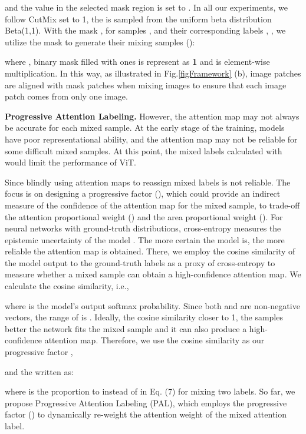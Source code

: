 \documentclass{article} \usepackage{iclr2023_conference,times}
\begin{document}
and the value in the selected mask region is set to . In all our experiments, we follow CutMix \citep{yun2019cutmix} set  to 1, the  is sampled from the uniform beta distribution Beta(1,1). With the mask , for samples ,  and their corresponding labels , , we utilize the mask  to generate their mixing samples ():



where , binary mask filled with ones is represent as \textbf{1} and  is element-wise multiplication. In this way, as illustrated in Fig.\ref{figFramework} (b), image patches are aligned with mask patches when mixing images to ensure that each image patch comes from only one image.

\textbf{Progressive Attention Labeling.} However, the attention map  may not always be accurate for each mixed sample. At the early stage of the training, models have poor representational ability, and the attention map  may not be reliable for some difficult mixed samples. At this point, the mixed labels calculated with  would limit the performance of ViT.

Since blindly using attention maps to reassign mixed labels is not reliable. The focus is on designing a  progressive factor (), which could provide an indirect measure of the confidence of the attention map for the mixed sample, to trade-off the attention proportional weight () and the area proportional weight (). For neural networks with ground-truth distributions, cross-entropy measures the epistemic uncertainty of the model \citep{2017What}. The more certain the model is, the more reliable the attention map is obtained. There, we employ the cosine similarity of the model output to the ground-truth labels as a proxy of cross-entropy to measure whether a mixed sample can obtain a high-confidence attention map. We calculate the cosine similarity, i.e., 


where  is the model’s output softmax probability. Since both  and  are non-negative vectors, the range of  is . Ideally, the cosine similarity  closer to 1, the samples better the network fits the mixed sample and it can also produce a high-confidence attention map. Therefore, we use the cosine similarity as our progressive factor , 



and the  written as:
\vspace{-10px}


where  is the proportion to instead of  in Eq. (7) for mixing two labels. So far, we propose Progressive Attention Labeling (PAL), which employs the progressive factor () to dynamically re-weight the attention weight of the mixed attention label. 
\end{document}
